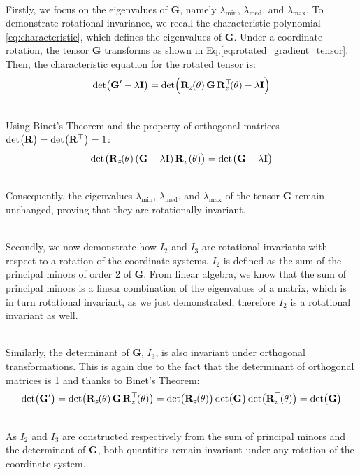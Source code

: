\documentclass[main]{subfiles}
\begin{document}
\noindent\\
Firstly, we focus on the eigenvalues of \( \mathbf{G} \), namely 
\( \lambda_{\text{min}} \), \( \lambda_{\text{med}} \), and \( \lambda_{\text{max}} \). 
To demonstrate rotational invariance, we recall the characteristic polynomial 
\eqref{eq:characteristic}, which defines the eigenvalues of \( \mathbf{G} \). 
Under a coordinate rotation, the tensor \( \mathbf{G} \) transforms as shown in 
Eq.\ref{eq:rotated_gradient_tensor}. Then, the characteristic equation for the rotated tensor is:
\[
 \det(\mathbf{G}' - \lambda \mathbf{I}) = 
 \det(\mathbf{R}_z\mkern-2mu(\theta) \, \mathbf{G} \, {\mathbf{R}}^\top_z\mkern-3.5mu(\theta) - \lambda \mathbf{I})
\]

\noindent\\
Using Binet's Theorem and the property of orthogonal matrices \( \det\mkern-2mu\big(\mathbf{R}\big) = \det\mkern-2mu\big(\mathbf{R}^\top\big) = 1 \):
\begin{equation}
 \det\mkern-2mu\big(\mathbf{R}_z\mkern-2mu(\theta) \, (\mathbf{G} - \lambda \mathbf{I}) \, {\mathbf{R}}^\top_z\mkern-3.5mu(\theta)\big) = 
 \det\mkern-2mu\big(\mathbf{G} - \lambda \mathbf{I}\big)
    \label{eq:rotational_invariance}
\end{equation}

\noindent\\
Consequently, the eigenvalues \( \lambda_{\text{min}} \), \( \lambda_{\text{med}} \), 
and \( \lambda_{\text{max}} \) of the tensor \( \mathbf{G} \) remain unchanged, 
proving that they are rotationally invariant.

\noindent\\
Secondly, we now demonstrate how \( I_2 \) and \( I_3 \) are rotational invariants 
with respect to a rotation of the coordinate systems.
\( I_2 \) is defined as the sum of the principal minors of order 2 of \( \mathbf{G} \). 
From linear algebra, we know that the sum of principal minors is a linear combination of the eigenvalues
of a matrix, which is in turn rotational invariant, as we just demonstrated, therefore \( I_2 \)
is a rotational invariant as well.

\noindent\\
Similarly, the determinant of \( \mathbf{G} \), \( I_3 \),
is also invariant under orthogonal transformations. 
This is again due to the fact that the determinant of orthogonal matrices is 1 and thanks
to Binet's Theorem:
\[
\det\mkern-3mu\big(\mathbf{G}'\big) = \det\mkern-3mu\big(\mathbf{R}_z\mkern-2mu(\theta) \, \mathbf{G} \, {\mathbf{R}}^\top_z\mkern-2mu(\theta)\big) = 
\det\mkern-3mu\big(\mathbf{R}_z\mkern-2mu(\theta) \big) \det\mkern-3mu\big(\mathbf{G}\big) \det\mkern-3mu\big({\mathbf{R}}^\top_z\mkern-2mu(\theta)\big) = 
\det\mkern-3mu\big(\mathbf{G}\big)
\]

\noindent\\
As \( I_2 \) and \( I_3 \) are constructed respectively from the sum of principal minors 
and the determinant of \( \mathbf{G} \), both quantities remain invariant under any rotation 
of the coordinate system.
\end{document}

